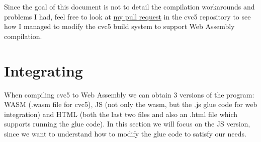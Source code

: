 \documentclass[12pt, a4paper]{article}
\begin{document}
Since the goal of this document is not to detail the compilation workarounds and
problems I had, feel free to look at
\href{https://github.com/cvc5/cvc5/pull/9006}{my pull request} in the cvc5
repository to see how I managed to modify the cvc5 build system to support Web
Assembly compilation.

\section{Integrating}

When compiling cvc5 to Web Assembly we can obtain 3 versions of the program: WASM (.wasm file for cvc5), JS (not only the wasm, but the .js glue code for web integration) and HTML (both the last two files and also an .html file which supports running the glue code). In this section we will focus on the JS version, since we want to understand how to modify the glue code to satisfy our needs.
\end{document}
